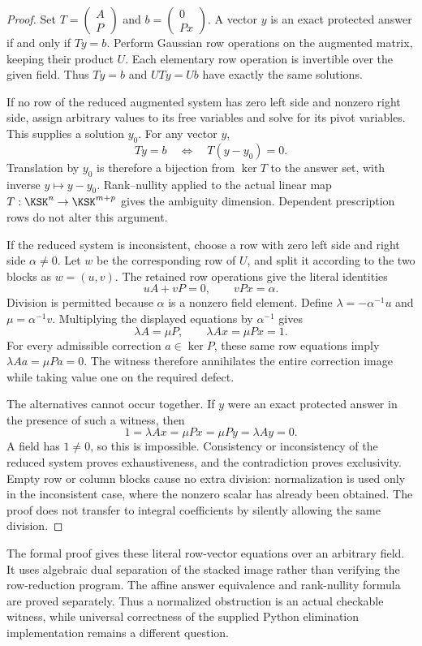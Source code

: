 \begin{proof}
Set \(T=\begin{pmatrix}A\\P\end{pmatrix}\) and \(b=\begin{pmatrix}0\\Px\end{pmatrix}\). A vector \(y\) is an exact protected answer if and only if \(Ty=b\). Perform Gaussian row operations on the augmented matrix, keeping their product \(U\). Each elementary row operation is invertible over the given field. Thus \(Ty=b\) and \(UTy=Ub\) have exactly the same solutions.

If no row of the reduced augmented system has zero left side and nonzero right side, assign arbitrary values to its free variables and solve for its pivot variables. This supplies a solution \(y_0\). For any vector \(y\),
\[
 Ty=b\quad\Longleftrightarrow\quad T(y-y_0)=0.
\]
Translation by \(y_0\) is therefore a bijection from \(\ker T\) to the answer set, with inverse \(y\mapsto y-y_0\). Rank--nullity applied to the actual linear map \(T:\KSK^n\to\KSK^{m+p}\) gives the ambiguity dimension. Dependent prescription rows do not alter this argument.

If the reduced system is inconsistent, choose a row with zero left side and right side \(\alpha\ne0\). Let \(w\) be the corresponding row of \(U\), and split it according to the two blocks as \(w=(u,v)\). The retained row operations give the literal identities
\[
 uA+vP=0,\qquad vPx=\alpha.
\]
Division is permitted because \(\alpha\) is a nonzero field element. Define \(\lambda=-\alpha^{-1}u\) and \(\mu=\alpha^{-1}v\). Multiplying the displayed equations by \(\alpha^{-1}\) gives
\[
 \lambda A=\mu P,\qquad \lambda Ax=\mu Px=1.
\]
For every admissible correction \(a\in\ker P\), these same row equations imply \(\lambda Aa=\mu Pa=0\). The witness therefore annihilates the entire correction image while taking value one on the required defect.

The alternatives cannot occur together. If \(y\) were an exact protected answer in the presence of such a witness, then
\[
 1=\lambda Ax=\mu Px=\mu Py=\lambda Ay=0.
\]
A field has \(1\ne0\), so this is impossible. Consistency or inconsistency of the reduced system proves exhaustiveness, and the contradiction proves exclusivity. Empty row or column blocks cause no extra division: normalization is used only in the inconsistent case, where the nonzero scalar has already been obtained. The proof does not transfer to integral coefficients by silently allowing the same division.
\end{proof}
The formal proof gives these literal row-vector equations over an arbitrary field. It uses algebraic dual separation of the stacked image rather than verifying the row-reduction program. The affine answer equivalence and rank-nullity formula are proved separately. Thus a normalized obstruction is an actual checkable witness, while universal correctness of the supplied Python elimination implementation remains a different question.


